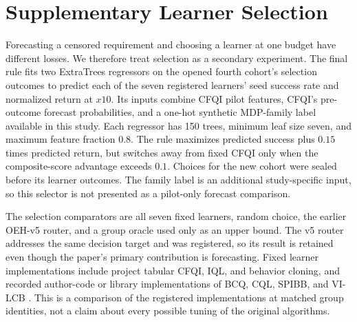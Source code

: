 \section{Supplementary Learner Selection}
\label{sec:selection}
Forecasting a censored requirement and choosing a learner at one budget have different losses. We therefore treat selection as a secondary experiment. The final rule fits two ExtraTrees regressors on the opened fourth cohort's selection outcomes to predict each of the seven registered learners' seed success rate and normalized return at $x10$. Its inputs combine CFQI pilot features, CFQI's pre-outcome \OEH{} forecast probabilities, and a one-hot synthetic MDP-family label available in this study. Each regressor has 150 trees, minimum leaf size seven, and maximum feature fraction $0.8$. The rule maximizes predicted success plus $0.15$ times predicted return, but switches away from fixed CFQI only when the composite-score advantage exceeds $0.1$. Choices for the new cohort were sealed before its learner outcomes. The family label is an additional study-specific input, so this selector is not presented as a pilot-only forecast comparison.

The selection comparators are all seven fixed learners, random choice, the earlier OEH-v5 router, and a group oracle used only as an upper bound. The v5 router addresses the same decision target and was registered, so its result is retained even though the paper's primary contribution is forecasting. Fixed learner implementations include project tabular CFQI, IQL, and behavior cloning, and recorded author-code or library implementations of BCQ, CQL, SPIBB, and VI-LCB \cite{fujimoto2019bcq,kumar2020cql,kostrikov2022iql,laroche2019spibb,li2024sample}. This is a comparison of the registered implementations at matched group identities, not a claim about every possible tuning of the original algorithms.
